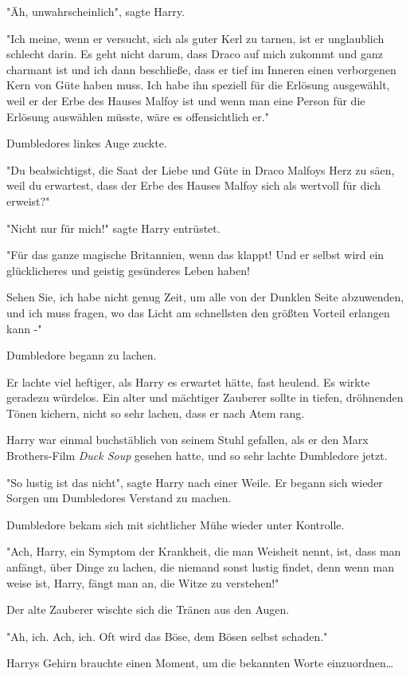 {"Äh, unwahrscheinlich", sagte Harry.

"Ich meine, wenn er versucht, sich als guter Kerl zu tarnen, ist er unglaublich schlecht darin. Es geht nicht darum, dass Draco auf mich zukommt und ganz charmant ist und ich dann beschließe, dass er tief im Inneren einen verborgenen Kern von Güte haben muss. Ich habe ihn speziell für die Erlösung ausgewählt, weil er der Erbe des Hauses Malfoy ist und wenn man eine Person für die Erlösung auswählen müsste, wäre es offensichtlich er."

Dumbledores linkes Auge zuckte.

"Du beabsichtigst, die Saat der Liebe und Güte in Draco Malfoys Herz zu säen, weil du erwartest, dass der Erbe des Hauses Malfoy sich als wertvoll für dich erweist?"

"Nicht nur für mich!" sagte Harry entrüstet.

"Für das ganze magische Britannien, wenn das klappt! Und er selbst wird ein glücklicheres und geistig gesünderes Leben haben!

Sehen Sie, ich habe nicht genug Zeit, um alle von der Dunklen Seite abzuwenden, und ich muss fragen, wo das Licht am schnellsten den größten Vorteil erlangen kann -"

Dumbledore begann zu lachen.

Er lachte viel heftiger, als Harry es erwartet hätte, fast heulend. Es wirkte geradezu würdelos. Ein alter und mächtiger Zauberer sollte in tiefen, dröhnenden Tönen kichern, nicht so sehr lachen, dass er nach Atem rang.

Harry war einmal buchstäblich von seinem Stuhl gefallen, als er den Marx Brothers-Film \emph{Duck Soup} gesehen hatte, und so sehr lachte Dumbledore jetzt.

"So lustig ist das nicht", sagte Harry nach einer Weile. Er begann sich wieder Sorgen um Dumbledores Verstand zu machen.

Dumbledore bekam sich mit sichtlicher Mühe wieder unter Kontrolle.

"Ach, Harry, ein Symptom der Krankheit, die man Weisheit nennt, ist, dass man anfängt, über Dinge zu lachen, die niemand sonst lustig findet, denn wenn man weise ist, Harry, fängt man an, die Witze zu verstehen!"

Der alte Zauberer wischte sich die Tränen aus den Augen.

"Ah, ich. Ach, ich. Oft wird das Böse, dem Bösen selbst schaden."

Harrys Gehirn brauchte einen Moment, um die bekannten Worte einzuordnen…

}
